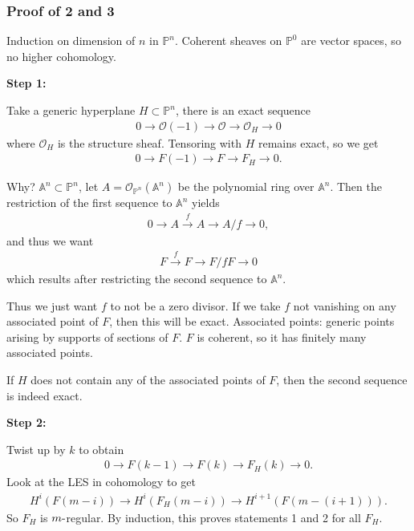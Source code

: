 \hypertarget{proof-of-2-and-3}{%
\subsubsection{Proof of 2 and 3}\label{proof-of-2-and-3}}

Induction on dimension of \(n\) in \({\mathbb{P}}^n\). Coherent sheaves
on \({\mathbb{P}}^0\) are vector spaces, so no higher cohomology.

\textbf{Step 1:}

Take a generic hyperplane \(H \subset {\mathbb{P}}^n\), there is an
exact sequence
\begin{align*}
0 \to {\mathcal{O}}(-1) \to {\mathcal{O}}\to {\mathcal{O}}_H \to 0
\end{align*}
where \({\mathcal{O}}_H\) is the structure sheaf. Tensoring with \(H\)
remains exact, so we get
\begin{align*}
0 \to F(-1) \to F \to F_H \to 0
.\end{align*}

Why? \({\mathbb{A}}^n \subset {\mathbb{P}}^n\), let
\(A = {\mathcal{O}}_{{\mathbb{P}}^n}({\mathbb{A}}^n)\) be the polynomial
ring over \({\mathbb{A}}^n\). Then the restriction of the first sequence
to \({\mathbb{A}}^n\) yields
\begin{align*}
0 \to A \xrightarrow{f} A \to A/f \to 0
,\end{align*}
and thus we want
\begin{align*}
F \xrightarrow{f} F \to F/fF \to 0
\end{align*}
which results after restricting the second sequence to
\({\mathbb{A}}^n\).

Thus we just want \(f\) to not be a zero divisor. If we take \(f\) not
vanishing on any associated point of \(F\), then this will be exact.
Associated points: generic points arising by supports of sections of
\(F\). \(F\) is coherent, so it has finitely many associated points.

If \(H\) does not contain any of the associated points of \(F\), then
the second sequence is indeed exact.

\textbf{Step 2:}

Twist up by \(k\) to obtain
\begin{align*}
0 \to F(k-1) \to F(k) \to F_H(k) \to 0
.\end{align*}
Look at the LES in cohomology to get
\begin{align*}
H^i(F(m-i)) \to H^i(F_H(m-i)) \to H^{i+1}(F(m - (i+1)))
.\end{align*}
So \(F_H\) is \(m{\hbox{-}}\)regular. By induction, this proves
statements 1 and 2 for all \(F_H\).

